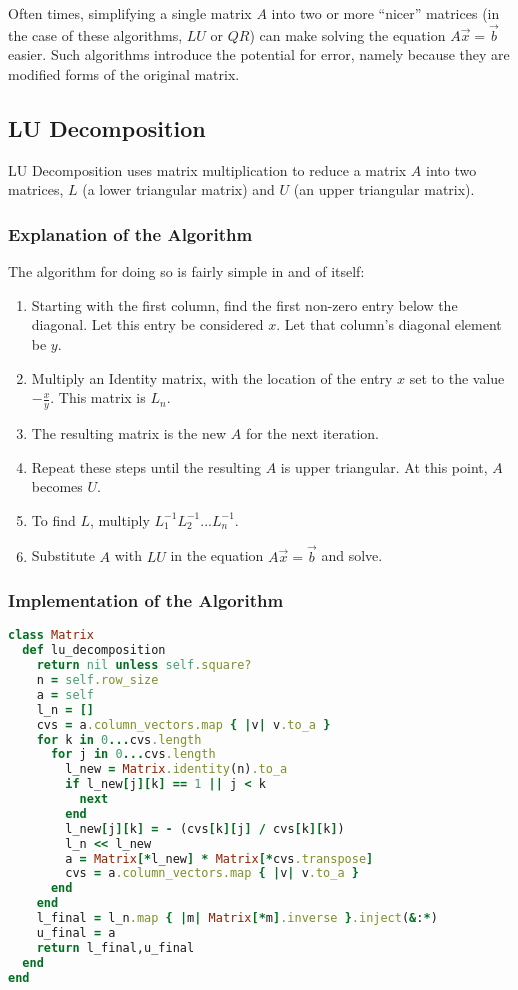 \documentclass[letterpaper,11pt]{article}
\begin{document}
Often times, simplifying a single matrix $A$ into two or more ``nicer'' matrices (in the case of these algorithms,
$LU$ or $QR$) can make solving the equation $A\vec{x}=\vec{b}$ easier.
Such algorithms introduce the potential for error, namely because they are modified forms of the original matrix.

\subsection{LU Decomposition}

LU Decomposition uses matrix multiplication to reduce a matrix $A$ into two matrices, $L$ (a lower
triangular matrix) and $U$ (an upper triangular matrix).

\subsubsection{Explanation of the Algorithm}

The algorithm for doing so is fairly simple in and of itself:

\begin{enumerate}
\item Starting with the first column, find the first non-zero entry below the diagonal. Let this entry be considered $x$. Let that column's diagonal element be $y$.
\item Multiply an Identity matrix, with the location of the entry $x$ set to the value $-\frac{x}{y}$. This matrix is $L_n$.
\item The resulting matrix is the new $A$ for the next iteration.
\item Repeat these steps until the resulting $A$ is upper triangular. At this point, $A$ becomes $U$.
\item To find $L$, multiply $L_1^{-1}L_2^{-1} ... L_n^{-1}$.
\item Substitute $A$ with $LU$ in the equation $A\vec{x}=\vec{b}$ and solve.
\end{enumerate}

\subsubsection{Implementation of the Algorithm}

\lstset{caption=LU Decomposition}
\begin{lstlisting}[language=ruby]
class Matrix
  def lu_decomposition
    return nil unless self.square?
    n = self.row_size
    a = self
    l_n = []
    cvs = a.column_vectors.map { |v| v.to_a }
    for k in 0...cvs.length
      for j in 0...cvs.length
        l_new = Matrix.identity(n).to_a
        if l_new[j][k] == 1 || j < k
          next
        end
        l_new[j][k] = - (cvs[k][j] / cvs[k][k])
        l_n << l_new
        a = Matrix[*l_new] * Matrix[*cvs.transpose]
        cvs = a.column_vectors.map { |v| v.to_a }
      end
    end
    l_final = l_n.map { |m| Matrix[*m].inverse }.inject(&:*)
    u_final = a
    return l_final,u_final
  end
end
\end{lstlisting}
\end{document}
